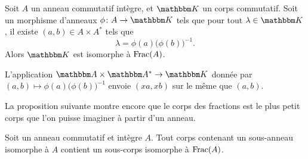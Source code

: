 \begin{theorem}     \label{ThogbhWgo}
    Soit \( A\) un anneau commutatif intègre, et \( \eK\) un corps commutatif. Soit un morphisme d'anneaux \( \phi\colon A\to \eK\) tels que pour tout \( \lambda\in\eK\), il existe \( (a,b)\in A\times A^*\) tels que
    \begin{equation}
        \lambda=\phi(a)\big( \phi(b) \big)^{-1}.
    \end{equation}
    Alors \( \eK\) est isomorphe à \( \operatorname{Frac}(A) \).
\end{theorem}


\begin{lemma}
    L'application \( \eA\times \eA^*\to \eK\) donnée par \( (a,b)\mapsto \phi(a)\big( \phi(b) \big)^{-1}\) envoie \( (xa,xb)\) sur le même que \( (a,b)\).
\end{lemma}

La proposition suivante montre encore que le corps des fractions est le plus petit corps que l'on puisse imaginer à partir d'un anneau.
\begin{proposition}
    Soit un anneau commutatif et intègre \( A\). Tout corps contenant un sous-anneau isomorphe à \( A\) contient un sous-corps isomorphe à \( \operatorname{Frac}(A)\).
\end{proposition}

